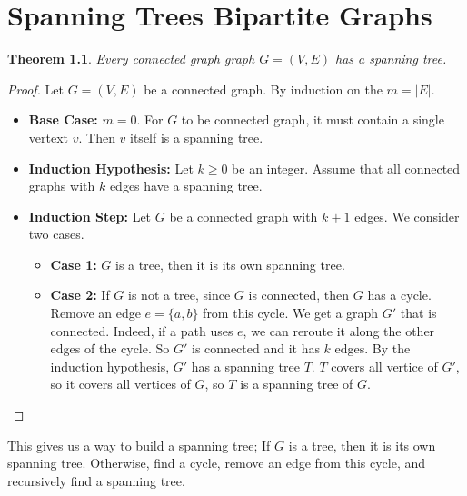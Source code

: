 \documentclass[openany]{report}
\newtheorem{theorem}{Theorem}[section]
\begin{document}
\chapter{Spanning Trees Bipartite Graphs}
\begin{theorem}
    Every connected graph graph $G = (V,E)$ has a spanning tree.
\end{theorem}
\begin{proof}
    Let $G = (V,E)$ be a connected graph. By induction on the $m = |E|$.
    \begin{itemize}
        \item \textbf{Base Case:} $m = 0$. For $G$ to be connected graph, it must contain a single vertext $v$. Then $v$ itself is a spanning tree. 
        \item \textbf{Induction Hypothesis:} Let $k \geq 0$ be an integer. Assume that all connected graphs with $k$ edges have a spanning tree.
        \item \textbf{Induction Step:} Let $G$ be a connected graph with $k+1$ edges. We consider two cases. 
        \begin{itemize}
            \item \textbf{Case 1:} $G$ is a tree, then it is its own spanning tree. 
            \item \textbf{Case 2:} If $G$ is not a tree, since $G$ is connected, then $G$ has a cycle. Remove an edge $e = \{a,b\}$ from this cycle. We get a graph $G'$ that is connected. Indeed, if a path uses $e$, we can reroute it along the other edges of the cycle. So $G'$ is connected and it has $k$ edges. By the induction hypothesis, $G'$ has a spanning tree $T$. $T$ covers all vertice of $G'$, so it covers all vertices of $G$, so $T$ is a spanning tree of $G$.
        \end{itemize}
    \end{itemize}
\end{proof}
This gives us a way to build a spanning tree; If $G$ is a tree, then it is its own spanning tree. Otherwise, find a cycle, remove an edge from this cycle, and recursively find a spanning tree.
\end{document}
